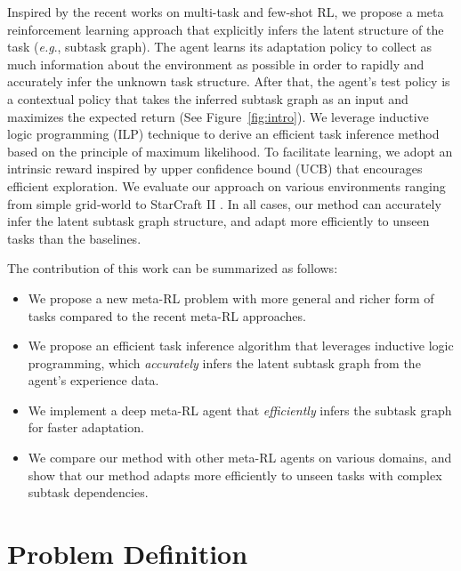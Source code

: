 \documentclass{article} \usepackage{iclr2020_conference,times}
\makeatletter
\DeclareRobustCommand\onedot{\futurelet\@let@token\@onedot}
\def\onedot{.}
\def\eg{\emph{e.g}\onedot} \def\Eg{\emph{E.g}\onedot}
\newcommand{\cutsectionup}{\vspace*{-0.1in}}
\newcommand{\cutsectiondown}{\vspace*{-0.05in}}
\newcommand{\cutitemizeup}{\vspace{-6pt}}
\providecommand{\tightlist}{\setlength{\itemsep}{0pt}\setlength{\parskip}{0pt}}
\makeatother
\begin{document}
Inspired by the recent works on multi-task and few-shot RL, we propose a meta reinforcement learning approach that
explicitly infers the latent structure of the task (\eg, subtask graph). The agent learns its adaptation policy to collect as much information about the environment as possible in order to
rapidly and accurately infer the unknown task structure. After that, the agent's test policy is a contextual policy that takes the inferred subtask graph as an input and maximizes the expected return (See Figure~\ref{fig:intro}).
We leverage inductive logic programming (ILP) technique to derive an efficient task inference method
based on the principle of maximum likelihood.
To facilitate learning, we adopt an intrinsic reward inspired by upper confidence bound (UCB) that encourages efficient exploration.
We evaluate our approach on various environments ranging from simple grid-world \citep{sohn2018hierarchical}
to StarCraft II \citep{vinyals2017starcraft}.
In all cases, our method can accurately infer the latent subtask graph structure,
and adapt more efficiently to unseen tasks than the baselines.

The contribution of this work can be summarized as follows:
\cutitemizeup
\begin{itemize}[leftmargin=*]
\tightlist \item We propose a new meta-RL problem with more general and richer form of tasks compared to the recent meta-RL approaches.
    \item We propose an efficient task inference algorithm that leverages inductive logic programming, which \textit{accurately} infers the latent subtask graph from the agent's experience data.\item We implement a deep meta-RL agent that \textit{efficiently} infers the subtask graph for faster adaptation.
    \item We compare our method with other meta-RL agents on various domains,
        and show that our method adapts more efficiently to unseen tasks with complex subtask dependencies.
\end{itemize}
 \cutsectionup
\section{Problem Definition}\label{sec:p}
\cutsectiondown
\end{document}
